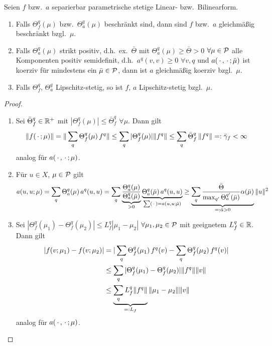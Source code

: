 \begin{satz}
\label{2.6}
	Seien $f$ bzw.\ $a$ separierbar parametrische stetige Linear- bzw.\ Bilinearform.
	\begin{enumerate}
		\item Falls $\Theta_f^q(\mu)$ bzw.\ $\Theta_a^q(\mu)$ beschränkt sind, dann sind $f$ bzw.\ $a$ gleichmäßig beschränkt bzgl.\ $\mu$.
		\item Falls $\Theta_a^q(\mu)$ strikt positiv, d.h.\ ex.\ $\bar \Theta$ mit $\Theta_a^q(\mu) \geq \bar \Theta > 0$ $\forall \mu \in \mathcal{P}$ alle Komponenten positiv semidefinit, d.h.\ $a^q(v,v) \geq 0$ $\forall v,q$ und $a(\,\cdot\,,\,\cdot\,;\bar \mu)$ ist koerziv für mindestens ein $\bar \mu \in \mathcal{P}$, dann ist $a$ gleichmäßig koerziv bzgl.\ $\mu$. 
		\item Falls $\Theta_f^q$, $\Theta_a^q$ Lipschitz-stetig, so ist $f$, $a$ Lipschitz-stetig bzgl.\ $\mu$.
	\end{enumerate}

	\begin{proof} \beginwithlistbew
		\begin{enumerate}
			\item Sei $\bar \Theta_f^q \in \mathbb{R}^+$ mit $|\Theta_f^q(\mu)| \leq \bar \Theta_f^q$ $\forall \mu$. Dann gilt
				\[
					\|f(\,\cdot\,;\mu)\| = \|\sum_q \Theta_f^q(\mu) \, f^q\| \leq \sum_q |\Theta_f^q(\mu)| \|f^q\| \leq \sum_q \bar \Theta_f^q \, \|f^q\| =: \bar \gamma_f < \infty
				\]
				analog für $a(\,\cdot\,,\,\cdot\,;\mu)$.
			\item Für $u \in X$, $\mu \in \mathcal{P}$ gilt
				\[
					a(u,u;\mu) = \sum_q \Theta_a^q(\mu) \, a^q(u,u) = \sum_q \underbrace{\frac{\Theta_a^q(\mu)}{\Theta_a^q(\bar \mu)}}_{> 0} \underbrace{\Theta_a^q(\bar\mu) \, a^q(u,u)}_{\sum (\,\cdot\,) = a(u,u;\bar\mu)} \geq \underbrace{\sum_q \frac{\bar \Theta}{\max_{q'} \Theta_a^{q'}(\bar \mu)} \alpha(\bar \mu)}_{=: \bar \alpha > 0} \|u\|^2
				\]
			\item Sei $|\Theta_f^q(\mu_1)-\Theta_f^q(\mu_2)| \leq L_f^q |\mu_1 - \mu_2|$ $\forall \mu_1,\mu_2 \in \mathcal{P}$ mit geeignetem $L_f^q \in \mathbb{R}$.
				Dann gilt
				\begin{align*}
					|f(v;\mu_1) - f(v;\mu_2)| &= |\sum_q \Theta_f^q(\mu_1) \, f^q(v) - \sum_q \Theta_f^q(\mu_2) \, f^q(v)|\\
					&\leq \sum_q |\Theta_f^q(\mu_1) - \Theta_f^q(\mu_2)| \|f^q\| \|v\| \\
					&\leq \underbrace{\sum_q L_f^q \|f^q\|}_{=: L_f} \|\mu_1 - \mu_2\| \|v\|
				\end{align*}
				analog für $a(\,\cdot\,,\,\cdot\,;\mu)$.
		\end{enumerate}
	\end{proof}
\end{satz}

